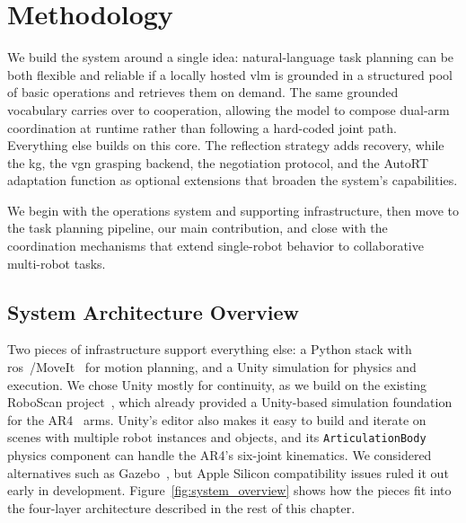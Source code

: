 \chapter{Methodology}\label{methodology}
We build the system around a single idea: natural-language task planning can be both flexible and reliable if a locally hosted \gls{vlm} is grounded in a structured pool of basic operations and retrieves them on demand. The same grounded vocabulary carries over to cooperation, allowing the model to compose dual-arm coordination at runtime rather than following a hard-coded joint path. Everything else builds on this core. The reflection strategy adds recovery, while the \gls{kg}, the \gls{vgn} grasping backend, the negotiation protocol, and the AutoRT adaptation function as optional extensions that broaden the system’s capabilities.

We begin with the operations system and supporting infrastructure, then move to the task planning pipeline, our main contribution, and close with the coordination mechanisms that extend single-robot behavior to collaborative multi-robot tasks.

\section{System Architecture Overview}\label{sec:overview}
Two pieces of infrastructure support everything else: a Python stack with \gls{ros}~\cite{Macenski_2022}/\allowbreak MoveIt~\cite{coleman2014reducingbarrierentrycomplex} for motion planning, and a Unity simulation for physics and execution. We chose Unity mostly for continuity, as we build on the existing RoboScan project~\cite{roboscan}, which already provided a Unity-based simulation foundation for the AR4~\cite{AnninRobotics2026} arms. Unity’s editor also makes it easy to build and iterate on scenes with multiple robot instances and objects, and its \texttt{ArticulationBody} physics component can handle the AR4’s six-joint kinematics. We considered alternatives such as Gazebo~\cite{gazebo}, but Apple Silicon compatibility issues ruled it out early in development. Figure~\ref{fig:system_overview} shows how the pieces fit into the four-layer architecture described in the rest of this chapter.

